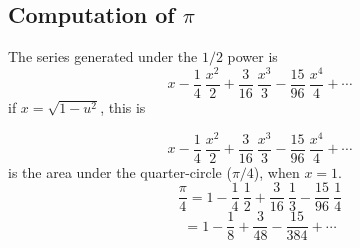 \documentclass[11pt, oneside]{article}
\begin{document}
\subsection*{Computation of $\pi$}
The series generated under the $1/2$ power is 
\[ x - \frac{1}{4} \ \frac{x^2}{2} + \frac{3}{16} \ \frac{x^3}{3} - \frac{15}{96} \ \frac{x^4}{4}  + \cdots \]
if $x = \sqrt{1-u^2}$, this is

\[ x - \frac{1}{4} \ \frac{x^2}{2} + \frac{3}{16} \ \frac{x^3}{3} - \frac{15}{96} \ \frac{x^4}{4}  + \cdots \]
is the area under the quarter-circle ($\pi/4$), when $x=1$.
\[ \frac{\pi}{4} = 1 - \frac{1}{4} \ \frac{1}{2} + \frac{3}{16} \ \frac{1}{3} - \frac{15}{96} \ \frac{1}{4}  \]
\[ = 1 - \frac{1}{8} + \frac{3}{48} - \frac{15}{384} + \cdots  \]
\end{document}

